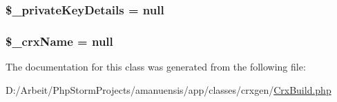 \subsubsection[{\$\+\_\+private\+Key\+Details}]{\setlength{\rightskip}{0pt plus 5cm}\$\+\_\+private\+Key\+Details = null\hspace{0.3cm}{\ttfamily [private]}}\label{class_crx_build_a05915f5862071215b68df0e6aea1062e}
\hypertarget{class_crx_build_ab55336ecdfbb6e7472f129ff288ab467}{}
\subsubsection[{\$\+\_\+crx\+Name}]{\setlength{\rightskip}{0pt plus 5cm}\$\+\_\+crx\+Name = null\hspace{0.3cm}{\ttfamily [private]}}\label{class_crx_build_ab55336ecdfbb6e7472f129ff288ab467}


The documentation for this class was generated from the following file\+:\begin{DoxyCompactItemize}
\item 
D\+:/\+Arbeit/\+Php\+Storm\+Projects/amanuensis/app/classes/crxgen/\hyperlink{_crx_build_8php}{Crx\+Build.\+php}\end{DoxyCompactItemize}
